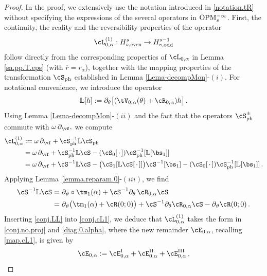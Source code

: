 \documentclass[a4paper,reqno,10pt]{article}
\newcommand{\pa}{\partial}
\newcommand{\OpM}{{\rm O}{\rm P}{\rm M}}
\newcommand{\LL}{\mathbb{L}}
\begin{document}
	 \begin{proof}
	 In the  proof, we extensively use the notation introduced in \eqref{notation.tR} without specifying the expressions of the several operators in $\OpM_{s}^{-\infty}$. First, the continuity, the reality and the reversibility properties of the operator
\begin{equation}\label{map.cL1}
	\cL_{0,\alpha}^{(1)} : H_{\circ,{\rm even}}^s \to H_{\circ,{\rm odd}}^{s-1}
\end{equation}
follow directly from the corresponding properties of $\cL_{0,\alpha}$ in Lemma \ref{sa.pp.T.eps} (with $\overline{r}=r_\alpha$), together with the mapping properties of the transformation $\cS_{\rm ph}$ established in Lemma \ref{Lema-decompMon}-$(i)$.
For notational  convenience, we introduce the operator 
     \begin{align}\label{LL11}
     \mathbb{L}[h]:=\pa_{\theta}\big[(\tV_{0,\alpha}(\theta)+\cR_{0,\alpha})h\big]\,.
     \end{align}
  Using Lemma \ref{Lema-decompMon}-$(ii)$ and the fact that the operators $\cS_{\rm ph}^{\pm}$ commute with $\omega\,\pa_{\vf},$ we compute
\begin{align}
    \cL_{0,\alpha}^{(1)} & := \omega\,\pa_{\vf} + \cS_{\rm ph}^{-1} \LL \cS_{\rm ph} \\
    & = \omega \,\pa_{\vf} + \cS_{\rm ph}^{-1}\LL \cS - (\cS_{0}[\,\cdot\,])\cS_{\rm ph}^{-1} [\LL[\bs_{1}]] \\
    & = \omega \,\pa_{\vf} + \cS^{-1}\LL \cS - \big( \cS_{1}[\LL \cS[\,\cdot\,]] \big) \cS^{-1}[\bs_{1}] - (\cS_{0}[\,\cdot\,])\cS_{\rm ph}^{-1} [\LL[\bs_{1}]] \,. \label{conj.cL1}
\end{align}
Applying Lemma \ref{lemma.reparam.0}-$(iii)$, we find
\begin{align}
	\cS^{-1} \LL \cS & = \pa_{\vartheta} \circ \tm_{1}(\alpha) + \cS^{-1} \pa_{\theta} \,\cR_{0,\alpha} \cS \\
	& = \pa_{\vartheta} \big( \tm_{1}(\alpha) + \cR(0;0) \big) +  \cS^{-1} \pa_{\theta} \cR_{0,\alpha} \cS - \pa_{\vartheta} \cR(0;0) \,. \label{conj.LL}
\end{align}
Inserting \eqref{conj.LL} into \eqref{conj.cL1}, we deduce that $\cL_{0,\alpha}^{(1)}$ takes the form in \eqref{conj.no.proj} and \eqref{diag.0.alpha},
where the new remainder $\cE_{0,\alpha}$, recalling \eqref{map.cL1}, is given by
\begin{equation}
	\cE_{0,\alpha}:= \cE_{0,\alpha}^{\rm I} + \cE_{0,\alpha}^{\rm II} + \cE_{0,\alpha}^{\rm III} \,,\label{cE0.split}

\end{equation}
\end{proof}
\end{document}
